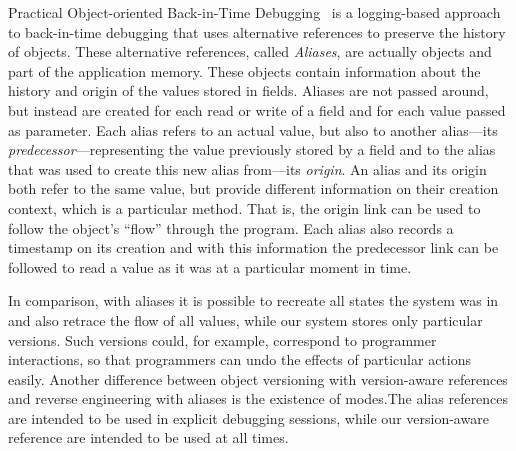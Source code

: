 Practical Object-oriented Back-in-Time Debugging~\cite{Lienhard2008POB,Lienhard2008PhD} is a logging-based approach to back-in-time debugging that uses alternative references to preserve the history of objects.
These alternative references, called \emph{Aliases}, are actually objects and part of the application memory.
These objects contain information about the history and origin of the values stored in fields.
Aliases are not passed around, but instead are created for each read or write of a field and for each value passed as parameter.
Each alias refers to an actual value, but also to another alias---its \emph{predecessor}---representing the value previously stored by a field and to the alias that was used to create this new alias from---its \emph{origin}.
An alias and its origin both refer to the same value, but provide different information on their creation context, which is a particular method.
That is, the origin link can be used to follow the object's ``flow'' through the program.
Each alias also records a timestamp on its creation and with this information the predecessor link can be followed to read a value as it was at a particular moment in time.

In comparison, with aliases it is possible to recreate all states the system was in and also retrace the flow of all values, while our system stores only particular versions.
Such versions could, for example, correspond to programmer interactions, so that programmers can undo the effects of particular actions easily.
Another difference between object versioning with version-aware references and reverse engineering with aliases is the existence of modes.The alias references are intended to be used in explicit debugging sessions, while our version-aware reference are intended to be used at all times.
